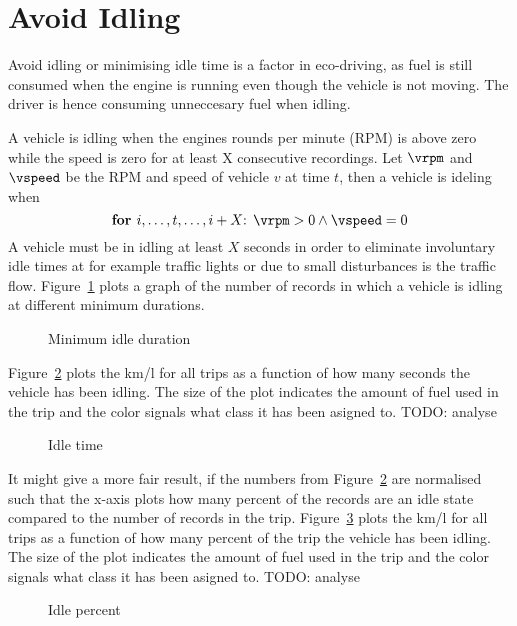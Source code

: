 \section{Avoid Idling}

Avoid idling or minimising idle time is a factor in eco-driving, as fuel is still consumed when the engine is running even though the vehicle is not moving.
The driver is hence consuming unneccesary fuel when idling.

A vehicle is idling when the engines rounds per minute (RPM) is above zero while the speed is zero for at least X consecutive recordings. %
Let $\vrpm$ and $\vspeed$ be the RPM and speed of vehicle $v$ at time $t$, then a vehicle is ideling when
\[\mbox{\textbf{for }} i, \dots ,t, \dots, i+X \mbox{: }\vrpm> 0 \wedge \vspeed=0 \]
A vehicle must be in idling at least $X$ seconds in order to eliminate involuntary idle times at for example traffic lights or due to small disturbances is the traffic flow.
Figure~\ref{fig:idleDuration} plots a graph of the number of records in which a vehicle is idling at different minimum durations. 

\begin{figure}[htb]
\centering
\caption{Minimum idle duration}
\label{fig:idleDuration}
\end{figure}

Figure~\ref{fig:idleTime} plots the km/l for all trips as a function of how many seconds the vehicle has been idling.
The size of the plot indicates the amount of fuel used in the trip and the color signals what class it has been asigned to.
TODO: analyse
\begin{figure}[htb]
\centering
\caption{Idle time}
\label{fig:idleTime}
\end{figure}

It might give a more fair result, if the numbers from Figure~\ref{fig:idleTime} are normalised such that the x-axis plots how many percent of the records are an idle state compared to the number of records in the trip.
Figure~\ref{fig:idlePercent} plots the km/l for all trips as a function of how many percent of the trip the vehicle has been idling.
The size of the plot indicates the amount of fuel used in the trip and the color signals what class it has been asigned to.
TODO: analyse
\begin{figure}[htb]
\centering
\caption{Idle percent}
\label{fig:idlePercent}
\end{figure}

